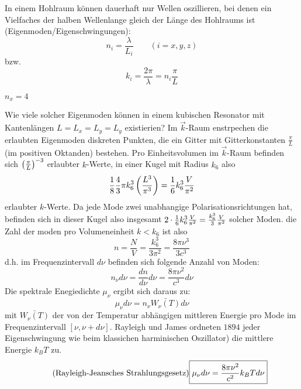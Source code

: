 In einem Hohlraum können dauerhaft nur Wellen oszillieren, bei denen ein
Vielfaches der halben Wellenlange gleich der Länge des Hohlraums ist
(Eigenmoden/Eigenschwingungen):
\begin{equation*}
    n_i =  \frac{\lambda}{L_i} \qquad (i = x,y,z)
\end{equation*}
bzw.
\begin{equation*}
    k_i = \frac{2\pi}{\lambda}=n_i \frac{\pi}{L}
\end{equation*}
\begin{beis}
    $n_x = 4$    
\end{beis}
Wie viele solcher Eigenmoden können in einem kubischen Resonator mit
Kantenlängen $L=L_x=L_y=L_y$ existierien? Im $\vec{k}$-Raum enstrpechen die erlaubten
Eigenmoden diskreten Punkten, die ein Gitter mit Gitterkonstanten
$\frac{\pi}{L}$ (im positiven Oktanden) bestehen. Pro Einheitsvolumen im
$\vec{k}$-Raum
befinden sich $\left( \frac{\pi}{L}\right)^{-3}$ erlaubter $k$-Werte, in einer Kugel
mit Radius $k_6$ also
\begin{equation*}
    \frac{1}{8}\frac{4}{3}\pi k_6^3 \left( \frac{L^3}{\pi^3} \right) 
    = \frac{1}{6}k_6^3 \frac{V}{\pi^2}
\end{equation*}
erlaubter $k$-Werte. Da jede Mode zwei unabhangige Polarisationsrichtungen hat,
befinden sich in dieser Kugel also insgesamt $2 \cdot \frac{1}{6} k_6^3
\frac{V}{\pi^2}= \frac{k_6^3}{3}\frac{V}{\pi^2}$ solcher Moden. die Zahl der
moden pro Volumeneinheit $k<k_6$ ist also
\begin{equation*}
    n= \frac{N}{V}= \frac{k_6^3}{3\pi^2}=\frac{8\pi\nu^3}{3c^3}
\end{equation*}
d.h. im Frequenzintervall $d\nu$ befinden sich folgende Anzahl von Moden:
    \begin{equation*}
    \boxed{
        n_{\nu} d\nu 
        =
        \frac{d n}{d \nu} d\nu = \frac{8 \pi \nu^2}{c^3} d\nu
        }
    \end{equation*}
Die spektrale Enegiedichte $\mu_{\nu}$ ergibt sich daraus zu:
\begin{equation*}
    \mu_{\nu} d \nu = n_{\nu} \bar{W_{\nu}(T)} d\nu
\end{equation*}
mit $\bar{W_{\nu}(T)}$ der von der Temperatur abhängigen mittleren Energie pro
Mode im Frequenzintervall $\left[ \nu, \nu+d\nu\right]$. Rayleigh und James
ordneten $1894$ jeder Eigenschwingung wie beim klassichen harminischen
Oszillator) die mittlere Energie $k_B T$ zu.
\begin{equation*}
\tag*{\text{(Rayleigh-Jeansches Strahlungsgesetz)}}
\boxed{
    \mu_{\nu} d\nu = \frac{8\pi\nu^2}{c^2}k_B T d\nu
    }
\end{equation*}
